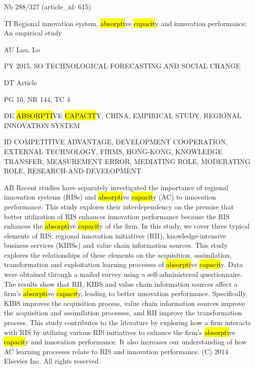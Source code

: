 \documentclass[a4paper]{article}
\begin{document}
\vspace*{-2cm}
Nb \tabto{0cm}288/327 (article\_id: 615)\par
TI \tabto{0cm}Regional innovation system, \hl{absorpti}ve \hl{capacit}y and innovation performance: An empirical study\par
AU \tabto{0cm}Lau, Lo\par
PY \tabto{0cm}2015, SO TECHNOLOGICAL FORECASTING AND SOCIAL CHANGE\par
DT \tabto{0cm}Article\par
PG \tabto{0cm}16, NR 144, TC 4\par
DE \tabto{0cm}\hl{ABSORPTI}VE \hl{CAPACIT}Y, CHINA, EMPIRICAL STUDY, REGIONAL INNOVATION SYSTEM\par
ID \tabto{0cm}COMPETITIVE ADVANTAGE, DEVELOPMENT COOPERATION, EXTERNAL TECHNOLOGY, FIRMS, HONG-KONG, KNOWLEDGE TRANSFER, MEASUREMENT ERROR, MEDIATING ROLE, MODERATING ROLE, RESEARCH-AND-DEVELOPMENT\par
AB \tabto{0cm}Recent studies have separately investigated the importance of regional innovation systems (RISs) and \hl{absorpti}ve \hl{capacit}y (AC) to innovation performance. This study explores their interdependency on the premise that better utilization of RIS enhances innovation performance because the RIS enhances the \hl{absorpti}ve \hl{capacit}y of the firm. In this study, we cover three typical elements of RIS: regional innovation initiatives (RII), knowledge-intensive business services (KIBSs) and value chain information sources. This study explores the relationships of these elements on the acquisition, assimilation, transformation and exploitation learning processes of \hl{absorpti}ve \hl{capacit}y. Data were obtained through a mailed survey using a self-administered questionnaire. The results show that RII, KIBS and value chain information sources affect a firm's \hl{absorpti}ve \hl{capacit}y, leading to better innovation performance. Specifically, KIBS improves the acquisition process, value chain information sources improve the acquisition and assimilation processes, and RII improve the transformation process. This study contributes to the literature by exploring how a firm interacts with RIS by utilizing various RIS initiatives to enhance the firm's \hl{absorpti}ve \hl{capacit}y and innovation performance. It also increases our understanding of how AC learning processes relate to RIS and innovation performance. (C) 2014 Elsevier Inc. All rights reserved.\par
\clearpage
\end{document}
